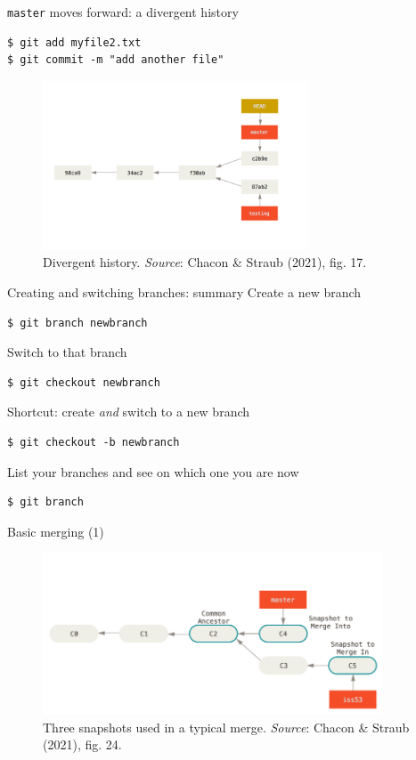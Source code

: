 \documentclass[handout]{beamer}
\begin{document}
\begin{frame}[fragile]{\texttt{master} moves forward: a divergent history}

\begin{lstlisting}
$ git add myfile2.txt
$ git commit -m "add another file"
\end{lstlisting}

\begin{figure}
	\includegraphics[width=0.7\textwidth]{figures/fig17_diverge.png}
	\caption{Divergent history. \textit{Source}: Chacon \& Straub (2021), fig. 17.}
\end{figure}
\end{frame}

\begin{frame}[fragile]{Creating and switching branches: summary}
Create a new branch
\begin{lstlisting}
$ git branch newbranch
\end{lstlisting}
Switch to that branch
\begin{lstlisting}
$ git checkout newbranch
\end{lstlisting}
Shortcut: create \textit{and} switch to a new branch 
\begin{lstlisting}
$ git checkout -b newbranch
\end{lstlisting}
List your branches and see on which one you are now
\begin{lstlisting}
$ git branch
\end{lstlisting}
\end{frame}

\begin{frame}{Basic merging (1)}
\begin{figure}
	\includegraphics[width=0.9\textwidth]{figures/fig24_pre_merge.png}
	\caption{Three snapshots used in a typical merge. \textit{Source}: Chacon \& Straub (2021), fig. 24.}
\end{figure}
\end{frame}
\end{document}
